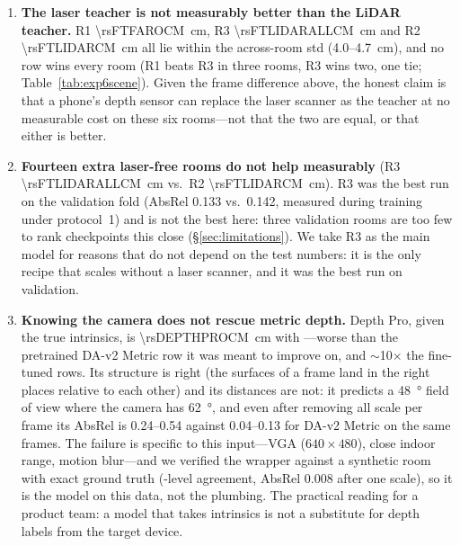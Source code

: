 \begin{enumerate}
\item \textbf{The laser teacher is not measurably better than the LiDAR teacher.} R1 \SI{\rsFTFAROCM}{cm}, R3
\SI{\rsFTLIDARALLCM}{cm} and R2 \SI{\rsFTLIDARCM}{cm} all lie within the across-room std (4.0--\SI{4.7}{cm}), and no
row wins every room (R1 beats R3 in three rooms, R3 wins two, one tie; Table~\ref{tab:exp6scene}). Given the frame
difference above, the honest claim is that a phone's depth sensor can replace the laser scanner as the teacher at no
measurable cost on these six rooms---not that the two are equal, or that either is better.
\item \textbf{Fourteen extra laser-free rooms do not help measurably} (R3 \SI{\rsFTLIDARALLCM}{cm} vs.\ R2
\SI{\rsFTLIDARCM}{cm}). R3 was the best run on the validation fold (AbsRel 0.133 vs.\ 0.142, measured during training under protocol~1) and is not the best here:
three validation rooms are too few to rank checkpoints this close (\S\ref{sec:limitations}). We take R3 as the main
model for reasons that do not depend on the test numbers: it is the only recipe that scales without a laser scanner,
and it was the best run on validation.
\item \textbf{Knowing the camera does not rescue metric depth.} Depth Pro, given the true intrinsics, is
\SI{\rsDEPTHPROCM}{cm} with \fscore{} \rsDEPTHPROF---worse than the pretrained DA-v2 Metric row it was meant to
improve on, and $\sim$10$\times$ the fine-tuned rows. Its structure is right (the surfaces of a frame land in the
right places relative to each other) and its distances are not: it predicts a \SI{48}{\degree} field of view where
the camera has \SI{62}{\degree}, and even after removing all scale per frame its AbsRel is 0.24--0.54 against
0.04--0.13 for DA-v2 Metric on the same frames. The failure is specific to this input---VGA
($640\times480$), close indoor range, motion blur---and we verified the wrapper against a synthetic room with exact
ground truth (\fscore{}-level agreement, AbsRel 0.008 after one scale), so it is the model on this data, not the
plumbing. The practical reading for a product team: a model that takes intrinsics is not a substitute for depth
labels from the target device.
\end{enumerate}

